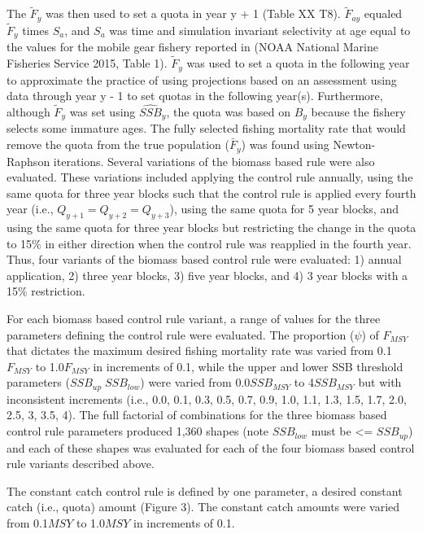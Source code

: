 \documentclass[]{article}
\begin{document}
The \(\tilde{F}_y\) was then used to set a quota in year y + 1 (Table XX
T8). \(\tilde{F}_{ay}\) equaled \(\tilde{F}_y\) times \(S_a\), and
\(S_a\) was time and simulation invariant selectivity at age equal to
the values for the mobile gear fishery reported in (NOAA National Marine
Fisheries Service 2015, Table 1). \(\tilde{F}_y\) was used to set a
quota in the following year to approximate the practice of using
projections based on an assessment using data through year y - 1 to set
quotas in the following year(s). Furthermore, although \(\tilde{F}_y\)
was set using \(\widehat{SSB}_y\), the quota was based on
\(\widehat{B}_y\) because the fishery selects some immature ages. The
fully selected fishing mortality rate that would remove the quota from
the true population (\(\bar{F}_y\)) was found using Newton-Raphson
iterations. Several variations of the biomass based rule were also
evaluated. These variations included applying the control rule annually,
using the same quota for three year blocks such that the control rule is
applied every fourth year (i.e., \(Q_{y+1}=Q_{y+2}=Q_{y+3}\)), using the
same quota for 5 year blocks, and using the same quota for three year
blocks but restricting the change in the quota to 15\% in either
direction when the control rule was reapplied in the fourth year. Thus,
four variants of the biomass based control rule were evaluated: 1)
annual application, 2) three year blocks, 3) five year blocks, and 4) 3
year blocks with a 15\% restriction.

For each biomass based control rule variant, a range of values for the
three parameters defining the control rule were evaluated. The
proportion (\(\psi\)) of \(F_{MSY}\) that dictates the maximum desired
fishing mortality rate was varied from 0.1\(F_{MSY}\) to 1.0\(F_{MSY}\)
in increments of 0.1, while the upper and lower SSB threshold parameters
(\(SSB_{up} \; SSB_{low}\)) were varied from 0.0\(SSB_{MSY}\) to
4\(SSB_{MSY}\) but with inconsistent increments (i.e., 0.0, 0.1, 0.3,
0.5, 0.7, 0.9, 1.0, 1.1, 1.3, 1.5, 1.7, 2.0, 2.5, 3, 3.5, 4). The full
factorial of combinations for the three biomass based control rule
parameters produced 1,360 shapes (note \(SSB_{low}\) must be
\textless{}= \(SSB_{up}\)) and each of these shapes was evaluated for
each of the four biomass based control rule variants described above.

The constant catch control rule is defined by one parameter, a desired
constant catch (i.e., quota) amount (Figure 3). The constant catch
amounts were varied from 0.1\(MSY\) to 1.0\(MSY\) in increments of 0.1.
\end{document}
